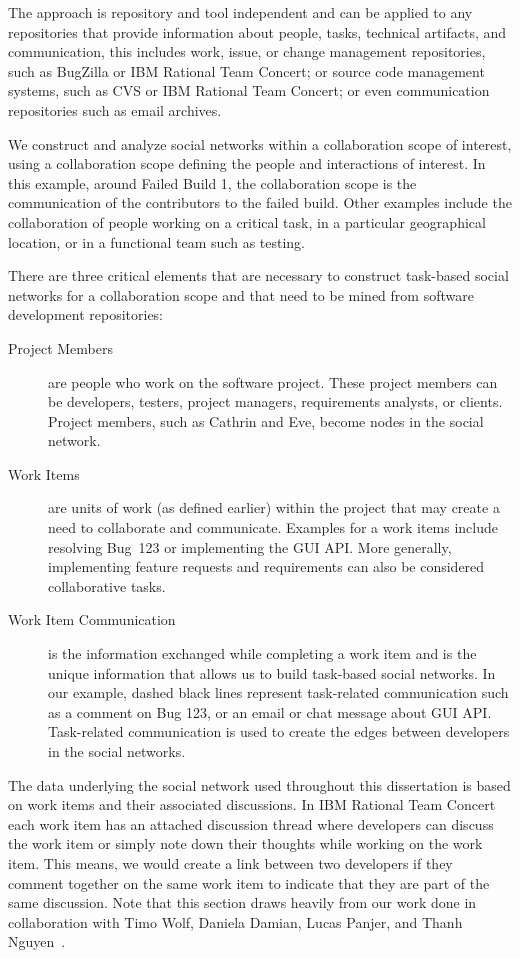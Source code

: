 The approach is repository and tool independent and can be applied to any repositories that provide information about people, tasks, technical artifacts, and communication, this includes work, issue, or change management repositories, such as BugZilla or IBM Rational Team Concert; or source code management systems, such as CVS or IBM Rational Team Concert; or even communication repositories such as email archives.

We construct and analyze social networks within a collaboration scope of interest, using a collaboration scope defining the people and interactions of interest.
In this example, around Failed Build 1, the collaboration scope is the communication of the contributors to the failed build. 
Other examples include the collaboration of people working on a critical task, in a particular geographical location, or in a functional team such as testing.

There are three critical elements that are necessary to construct task-based social networks for a collaboration scope and that need to be mined from software development repositories:

\begin{description}
\item[Project Members] are people who work on the software project. 
These project members can be developers, testers, project managers, requirements analysts,
or clients. 
Project members, such as Cathrin and Eve, become nodes in the social network.

\item[Work Items] are units of work (as defined earlier) within the project that may create a need to collaborate and communicate. 
Examples for a work items include resolving Bug~123 or implementing the GUI API. 
More generally, implementing feature requests and requirements can also be considered collaborative tasks.

\item[Work Item Communication] is the information exchanged while completing a work item and is the unique information that allows us to build task-based social networks. 
In our example, dashed black lines represent task-related communication such as a comment on Bug 123, or an email or chat message about GUI API.
Task-related communication is used to create the edges between developers in the social networks.
\end{description}

The data underlying the social network used throughout this dissertation is based on work items and their associated discussions.
In IBM Rational Team Concert each work item has an attached discussion thread where developers can discuss the work item or simply note down their thoughts while working on the work item.
This means, we would create a link between two developers if they comment together on the same work item to indicate that they are part of the same discussion.
Note that this section draws heavily from our work done in collaboration with Timo Wolf, Daniela Damian, Lucas Panjer, and Thanh Nguyen~\cite{wolf:ieee:2009}.

